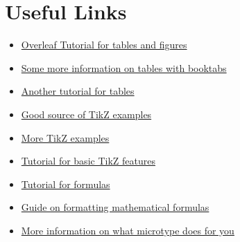 \documentclass[10pt,parskip=half]{scrartcl}
\begin{document}
\section{Useful Links} 
\begin{itemize}
\item \href{https://de.overleaf.com/learn/latex/How_to_Write_a_Thesis_in_LaTeX_(Part_3)%3A_Figures%2C_Subfigures_and_Tables#Subfigures}{Overleaf Tutorial for tables and figures}
\item \href{https://golatex.de/wiki/booktabs}{Some more information on tables with booktabs}
\item \href{https://jdhao.github.io/2019/08/27/latex_table_with_booktabs/}{Another tutorial for tables}
\item \href{https://texample.net/tikz/examples/}{Good source of TikZ examples}
\item \href{https://tikz.net/}{More TikZ examples}
\item \href{https://www.overleaf.com/learn/latex/TikZ_package}{Tutorial for basic TikZ features}
\item \href{https://www.resurchify.com/latex_tutorial/latex_alignment.php}{Tutorial for formulas}
\item \href{https://en.wikibooks.org/wiki/LaTeX/Advanced_Mathematics}{Guide on formatting mathematical formulas}
\item \href{http://www.khirevich.com/latex/microtype/}{More information on what microtype does for you}
\end{itemize}




	
\end{document}
